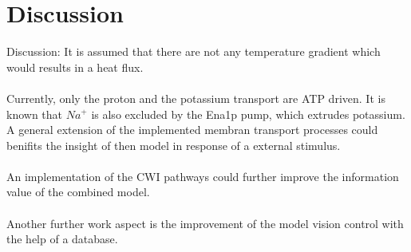 \section{Discussion}
Discussion: It is assumed that there are not any temperature gradient which would results in a heat flux.\\\\
Currently, only the proton and the potassium transport are ATP driven. It is known that $Na^+$ is also excluded by the Ena1p pump, which extrudes potassium. A general extension of the implemented membran transport processes could benifits the insight of then model in response of a external stimulus.\\\\
An implementation of the CWI pathways could further improve the information value of the combined model.\\\\
Another further work aspect is the improvement of the model vision control with the help of a database.